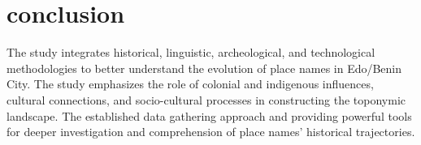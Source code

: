 \section{conclusion}
The study integrates historical, linguistic, archeological, and technological methodologies to better understand the evolution of place names in Edo/Benin City. The study emphasizes the role of colonial and indigenous influences, cultural connections, and socio-cultural processes in constructing the toponymic landscape. The established data gathering approach and providing powerful tools for deeper investigation and comprehension of place names' historical trajectories.
